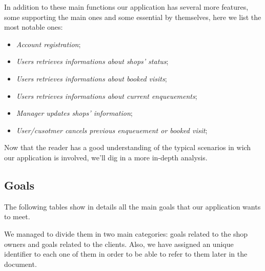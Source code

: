 In addition to these main functions our application has several more features, some supporting the main ones and some essential by themselves, here we list the most notable ones:
\begin{itemize}[topsep=0pt]
    \item \textit{Account registration};
    \item \textit{Users retrieves informations about shops' status};
    \item \textit{Users retrieves informations about booked visits};
    \item \textit{Users retrieves informations about current enqueuements};
    \item \textit{Manager updates shops' information};
    \item \textit{User/cusotmer cancels previous enqueuement or booked visit};
\end{itemize}

Now that the reader has a good understanding of the typical scenarios in wich our application is involved, we'll dig in a more in-depth analysis.

\subsection{Goals}
\label{subsect:goals}

The following tables show in details all the main goals that our application wants to meet. 

We managed to divide them in two main categories: goals related to the shop owners and goals related to the clients. Also, we have assigned an unique identifier to each one of them in order to be able to refer to them later in the document.

